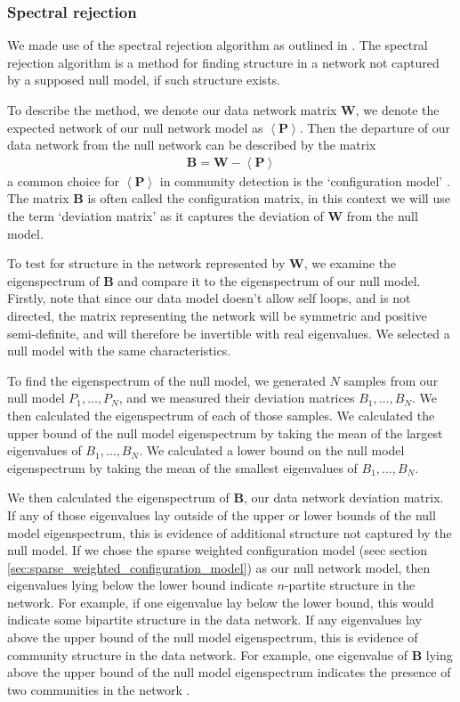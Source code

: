 \documentclass[a4paper,12pt]{article}
\theoremstyle{definition}
\begin{document}
        \subsubsection{Spectral rejection}\label{sec:spectral_rejection}
        We made use of the spectral rejection algorithm as outlined in \cite{humphries}. The spectral rejection algorithm is a method for finding structure in a network not captured by a supposed null model, if such structure exists. 
        
        To describe the method, we denote our data network matrix $\mathbf{W}$, we denote the expected network of our null network model as $\left\langle \mathbf{P} \right\rangle$. Then the departure of our data network from the null network can be described by the matrix
        \begin{align}
          \mathbf{B} = \mathbf{W} - \left\langle \mathbf{P} \right\rangle
        \end{align}
        a common choice for $\left\langle \mathbf{P} \right\rangle$ in community detection is the `configuration model' \cite{fosdick, humphries2}. The matrix $\mathbf{B}$ is often called the configuration matrix, in this context we will use the term `deviation matrix' as it captures the deviation of $\mathbf{W}$ from the null model. 

        To test for structure in the network represented by $\mathbf{W}$, we examine the eigenspectrum of $\mathbf{B}$ and compare it to the eigenspectrum of our null model. Firstly, note that since our data model doesn't allow self loops, and is not directed, the matrix representing the network will be symmetric and positive semi-definite, and will therefore be invertible with real eigenvalues. We selected a null model with the same characteristics. 
        
        To find the eigenspectrum of the null model, we generated $N$ samples from our null model $P_1, \dots, P_N$, and we measured their deviation matrices $B_1, \dots, B_N$. We then calculated the eigenspectrum of each of those samples. We calculated the upper bound of the null model eigenspectrum by taking the mean of the largest eigenvalues of $B_1, \dots, B_N$. We calculated a lower bound on the null model eigenspectrum by taking the mean of the smallest eigenvalues of $B_1, \dots, B_N$. 

        We then calculated the eigenspectrum of $\mathbf{B}$, our data network deviation matrix. If any of those eigenvalues lay outside of the upper or lower bounds of the null model eigenspectrum, this is evidence of additional structure not captured by the null model. If we chose the sparse weighted configuration model (seec section \ref{sec:sparse_weighted_configuration_model}) as our null network model, then eigenvalues lying below the lower bound indicate $n$-partite structure in the network. For example, if one eigenvalue lay below the lower bound, this would indicate some bipartite structure in the data network. If any eigenvalues lay above the upper bound of the null model eigenspectrum, this is evidence of community structure in the data network. For example, one eigenvalue of $\mathbf{B}$ lying above the upper bound of the null model eigenspectrum indicates the presence of two communities in the network \cite{humphries2}.
\end{document}
